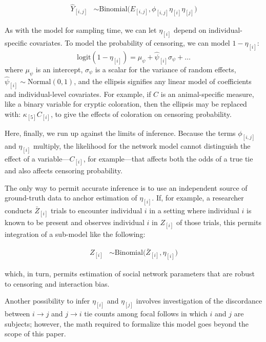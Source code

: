 \documentclass[Afour,sageh,times]{sagej}
\begin{document}
\begin{ceqn}
\begin{align}\label{maineq2}
	\hat Y_{[i,j]} &\sim \mathrm{Binomial}\Big(E_{[i,j]}, \phi_{[i,j]}\eta_{[i]}\eta_{[j]} \Big)
\end{align}
\end{ceqn}
As with the model for sampling time, we can let $\eta_{[i]}$ depend on individual-specific covariates. To model the probability of censoring, we can model  $1-\eta_{[i]}$:
\begin{equation}\label{vcxd}
\text{logit}(1-\eta_{[i]}) = \mu_\psi + \hat\psi_{[i]}  \sigma_\psi + \ldots 
\end{equation}
where $\mu_\psi$ is an intercept, $\sigma_\psi$ is a scalar for the variance of random effects, $\hat\psi_{[i]}\sim \text {Normal}(0,1)$, and the ellipsis signifies any linear model of coefficients and individual-level covariates. For example, if $C$ is an animal-specific measure, like a binary variable for cryptic coloration, then the ellipsis may be replaced with:  $\kappa_{[5]}C_{[i]}$, to give the effects of coloration on censoring probability.

Here, finally, we run up against the limits of inference. Because the terms $\phi_{[i,j]}$ and $\eta_{[i]}$ multiply, the likelihood for the network model cannot distinguish the effect of a variable---$C_{[i]}$, for example---that affects both the odds of a true tie and also affects censoring probability.

The only way to permit accurate inference is to use an independent source of ground-truth data to anchor estimation of $\eta_{[i]}$. If, for example, a researcher conducts $\bar Z_{[i]}$ trials to encounter individual $i$ in a setting where individual $i$ is known to be present and observes individual $i$ in $Z_{[i]}$ of those trials, this permits integration of a sub-model like the following:
\begin{ceqn}
\begin{align}\label{maineq2}
 Z_{[i]} &\sim \mathrm{Binomial}\Big(\bar Z_{[i]}, \eta_{[i]} \Big)
\end{align}
\end{ceqn}
which, in turn, permits estimation of social network parameters that are robust to censoring and interaction bias. 

Another possibility to infer $\eta_{[i]}$ and $\eta_{[j]}$ involves investigation of the discordance between $i\to j$ and $j \to i$ tie counts among focal follows in which $i$ and $j$ are subjects; however, the math required to formalize this model goes beyond the scope of this paper.
\end{document}

